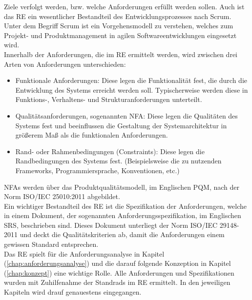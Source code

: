     Ziele verfolgt werden, bzw. welche Anforderungen erfüllt werden sollen. Auch ist das \acl{RE} ein wesentlicher 
    Bestandteil des Entwicklungsprozesses nach Scrum. Unter dem Begriff Scrum ist ein Vorgehensmodell zu verstehen, 
    welches zum Projekt- und Produktmanagement in agilen Softwareentwicklungen eingesetzt wird. 
    \\
    \linebreak
    Innerhalb der Anforderungen, die im \acl{RE} ermittelt werden, wird zwischen drei Arten von Anforderungen unterschieden: 
    \begin{itemize}
        \item Funktionale Anforderungen: Diese legen die Funktionalität fest, die durch die Entwicklung des Systems 
            erreicht werden soll. Typischerweise werden diese in Funktions-, Verhaltens- und Strukturanforderungen unterteilt.
        \item Qualitätsanforderungen, sogenannten \ac{NFA}: Diese legen die Qualitäten des Systems fest und beeinflussen die Gestaltung der 
            Systemarchitektur in größerem Maß als die funktionalen Anforderungen.
        \item Rand- oder Rahmenbedingungen (Constraints): Diese legen die Randbedingungen des Systems fest. (Beispielsweise die zu nutzenden Frameworks, Programmiersprache, Konventionen, etc.)
    \end{itemize}
    \acp{NFA} werden über das Produktqualitätsmodell, im Englischen \ac{PQM}, nach der Norm ISO/IEC 25010:2011 abgebildet. \cite{ISO-IEC-PQM2011}
    \\
    \linebreak
    Ein wichtiger Bestandteil des \acl{RE} ist die Spezifikation der Anforderungen, welche in einem Dokument, der 
    sogenannten Anforderungsspezifikation, im Englischen \ac{SRS}, beschrieben sind. Dieses Dokument unterliegt der 
    Norm ISO/IEC 29148-2011 und deckt die Qualitätskriterien ab, damit die Anforderungen einem gewissen Standard 
    entsprechen. 
    \\
    \linebreak
    Das \acl{RE} spielt für die Anforderungsanalyse in Kapitel (\ref{chap:anforderungsanalyse}) und die darauf folgende 
    Konzeption in Kapitel (\ref{chap:konzept}) eine wichtige Rolle. Alle Anforderungen und Spezifikationen wurden 
    mit Zuhilfenahme der Standrads im \acl{RE} ermittelt. In den jeweiligen Kapiteln wird drauf genauestens eingegangen. 

